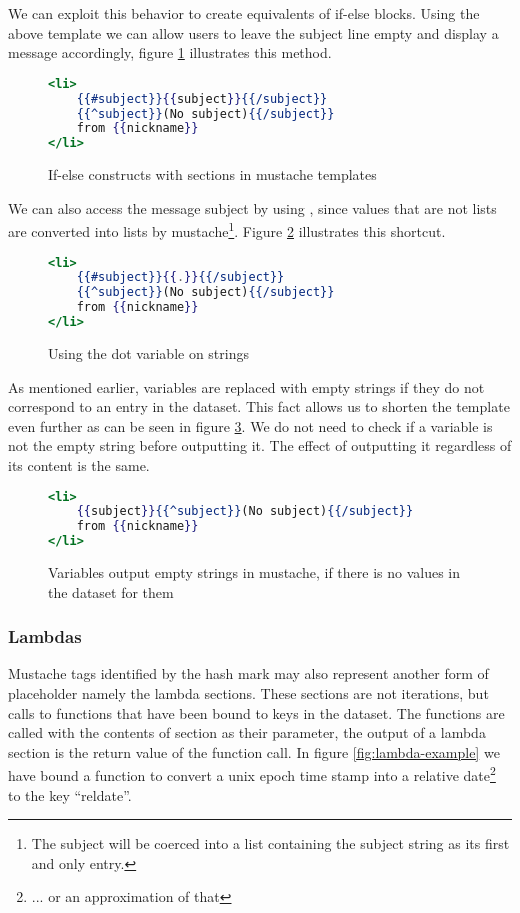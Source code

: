 \documentclass[thesis.tex]{subfiles}
\begin{document}
We can exploit this behavior to create equivalents of if-else blocks.
Using the above template we can allow users to leave the subject line empty
and display a message accordingly, figure \ref{fig:ifelse.mustache} illustrates
this method.
\begin{figure}
	\centering
	\begin{lstlisting}[language=mustache]
<li>
	{{#subject}}{{subject}}{{/subject}}
	{{^subject}}(No subject){{/subject}}
	from {{nickname}}
</li>
	\end{lstlisting}
	\caption{If-else constructs with sections in mustache templates}
	\label{fig:ifelse.mustache}
\end{figure}

We can also access the message subject by using ,
since values that are not lists are converted into lists by mustache\footnote{
	The subject will be coerced into a list containing the subject string as its
	first and only entry.
}. Figure \ref{fig:dot-oper2.mustache} illustrates this shortcut.

\begin{figure}
	\centering
	\begin{lstlisting}[language=mustache]
<li>
	{{#subject}}{{.}}{{/subject}}
	{{^subject}}(No subject){{/subject}}
	from {{nickname}}
</li>
	\end{lstlisting}
	\caption{Using the dot variable on strings}
	\label{fig:dot-oper2.mustache}
\end{figure}

As mentioned earlier, variables are replaced with empty strings if
they do not correspond to an entry in the dataset.
This fact allows us to shorten the template even further as can be seen in
figure \ref{fig:emptystr.mustache}.
We do not need to check if a variable is not the empty string before outputting
it. The effect of outputting it regardless of its content is the same.

\begin{figure}
	\centering
	\begin{lstlisting}[language=mustache]
<li>
	{{subject}}{{^subject}}(No subject){{/subject}}
	from {{nickname}}
</li>
	\end{lstlisting}
	\caption{Variables output empty strings in mustache, if there is no values in the dataset for them}
	\label{fig:emptystr.mustache}
\end{figure}

\subsubsection{Lambdas}
Mustache tags identified by the hash mark may also represent another form of
placeholder namely the lambda sections. These sections are not iterations, but
calls to functions that have been bound to keys in the dataset.
The functions are called with the contents of section as their parameter, the
output of a lambda section is the return value of the function call.
In figure \ref{fig:lambda-example} we have bound a function to convert a
unix epoch time stamp into a relative date\footnote{... or an approximation of that}
to the key ``reldate''.
\end{document}
